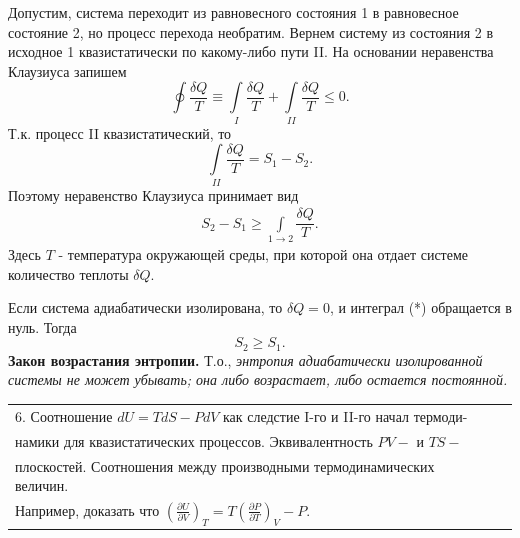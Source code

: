 \documentclass[14pt,a4paper]{scrartcl}
\begin{document}
	\quad Допустим, система переходит из равновесного состояния 1 в равновесное состояние 2, но процесс перехода необратим. Вернем систему из состояния 2 в исходное 1 квазистатически по какому-либо пути II. На основании неравенства Клаузиуса запишем $$\oint \dfrac{\delta Q}{T} \equiv \int\limits_I \dfrac{\delta Q}{T} + \int\limits_{II} \dfrac{\delta Q}{T} \leqslant 0.$$ Т.к. процесс II квазистатический, то $$\int\limits_{II}\dfrac{\delta Q}{T}=S_1-S_2.$$ Поэтому неравенство Клаузиуса принимает вид \begin{align} S_2 - S_1 \geqslant \int\limits_{1\to2}\dfrac{\delta Q}{T}.\tag{*}\end{align} Здесь $T$ - температура окружающей среды, при которой она отдает системе количество теплоты $\delta Q$.
	
	\quad Если система адиабатически изолирована, то $\delta Q = 0$, и интеграл (*) обращается в нуль. Тогда $$S_2 \geqslant S_1.$$  \textbf{Закон возрастания энтропии.} Т.о., \textit{энтропия адиабатически изолированной системы не может убывать; она либо возрастает, либо остается постоянной.}\\
	
		\begin{tabular}[t]{|l|ll|} 
		\hline
		6. Соотношение $dU = TdS - PdV$ как следстие I-го и II-го начал термоди-\\намики	для квазистатических процессов. Эквивалентность $PV -$ и $TS-$ \\плоскостей. Соотношения между производными термодинамических величин. 	\\Например, доказать что	$(\frac{\partial U}{\partial V})_T = T(\frac{\partial P}{\partial T})_V - P.$	\\
		\hline
	\end{tabular}\\\\
\end{document}
